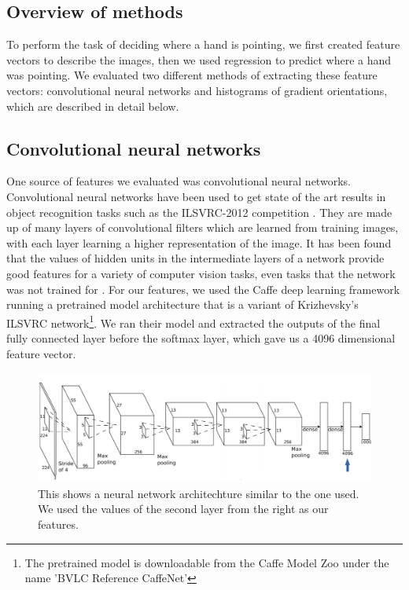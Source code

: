 \documentclass[10pt,twocolumn,letterpaper]{article}
\begin{document}
\subsection{Overview of methods}

To perform the task of deciding where a hand is pointing, we first created feature vectors to describe the images, then we used regression to predict where a hand was pointing.  We evaluated two different methods of extracting these feature vectors: convolutional neural networks and histograms of gradient orientations, which are described in detail below.

\subsection{Convolutional neural networks}

One source of features we evaluated was convolutional neural networks.  Convolutional neural networks have been used to get state of the art results in object recognition tasks such as the ILSVRC-2012 competition \cite{krizhevsky2012imagenet}.  They are made up of many layers of convolutional filters which are learned from training images, with each layer learning a higher representation of the image.   It has been found that the values of hidden units in the intermediate layers of a network provide good features for a variety of computer vision tasks, even tasks that the network was not trained for \cite{donahue2013decaf}.  For our features, we used the Caffe deep learning framework\cite{jia2014caffe} running a pretrained model architecture that is a variant of Krizhevsky's ILSVRC network\cite{krizhevsky2012imagenet}\footnote{The pretrained model is downloadable from the Caffe Model Zoo under the name 'BVLC Reference CaffeNet'}.  We ran their model and extracted the outputs of the final fully connected layer before the softmax layer, which gave us a 4096 dimensional feature vector.

\begin{figure}
	\begin{center}
		\includegraphics[height=140px]{figures/cnn.png}
	\end{center}
	\caption{This shows a neural network architechture similar to the one used.  We used the values of the second layer from the right as our features.}
	\label{fig:pointImages}
\end{figure}
\end{document}
